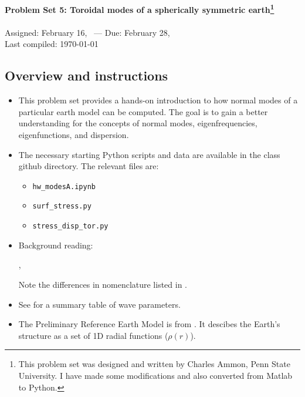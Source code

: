 \documentclass[11pt,titlepage,fleqn]{article}
\newcommand{\tfilemain}{{\tt hw\_modesA.ipynb}}
\newcommand{\tfiless}{{\tt surf\_stress.py}}
\newcommand{\tfilesdt}{{\tt stress\_disp\_tor.py}}
\begin{document}

\begin{spacing}{1.2}
\centering
{\large \bf Problem Set 5: Toroidal modes of a spherically symmetric earth\footnote{This problem set was designed and written by Charles Ammon, Penn State University. I have made some modifications and also converted from Matlab to Python.}} \\
\cltag\ \\
Assigned: February 16, \cyear\ --- Due: February 28, \cyear\ \\
Last compiled: \today \\
\end{spacing}


\subsection*{Overview and instructions}

\begin{itemize}

\item This problem set provides a hands-on introduction to how normal modes of a particular earth model can be computed. The goal is to gain a better understanding for the concepts of normal modes, eigenfrequencies, eigenfunctions, and dispersion.

\item The necessary starting Python scripts and data are available in the class github directory. The relevant files are:
%
\begin{itemize}
\item \tfilemain\
\item \tfiless\
\item \tfilesdt\
\end{itemize}

\item Background reading:

\citet[][Section 2.9]{SteinWysession}, \citet[][Ch.~8]{DT}

Note the differences in nomenclature listed in .

\item See  for a summary table of wave parameters.

\item The Preliminary Reference Earth Model is from \citet{PREM}. It descibes the Earth's structure as a set of 1D radial functions (\eg $\rho(r)$).

\end{itemize}
\end{document}
